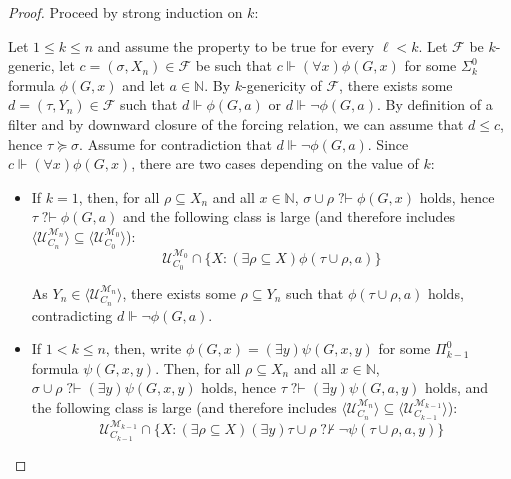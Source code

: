 \documentclass{article}
\def\NN{\mathbb{N}}
\def\F{\mathcal{F}}
\def\U{\mathcal{U}}
\def\M{\mathcal{M}}
\newcommand{\qvdash}{\operatorname{{?}{\vdash}}}
\newcommand{\nqvdash}{\operatorname{{?}{\nvdash}}}
\numberwithin{theorem}{section}
\newtheorem{proposition}[theorem]{Proposition}
\theoremstyle{definition}
\begin{document}

\begin{proof}
Proceed by strong induction on $k$:

Let $1 \leq k \leq n$ and assume the property to be true for every $\ell < k$. Let $\F$ be $k$-generic, let $c = (\sigma, X_n) \in \F$ be such that $c \Vdash (\forall x) \phi(G,x)$ for some $\Sigma_{k}^0$ formula $\phi(G,x)$ and let $a \in \NN$. By $k$-genericity of $\F$, there exists some $d = (\tau,Y_n) \in \F$ such that $d \Vdash \phi(G,a)$ or $d \Vdash \neg \phi(G,a)$. By definition of a filter and by downward closure of the forcing relation, we can assume that $d \leq c$, hence $\tau \succeq \sigma$. Assume for contradiction that $d \Vdash \neg \phi(G,a)$. Since $c \Vdash (\forall x)\phi(G,x)$, there are two cases depending on the value of $k$:
\begin{itemize}
    \item If $k = 1$, then, for all $\rho \subseteq X_n$ and all $x \in \NN$, $\sigma \cup \rho \qvdash \phi(G,x)$ holds, hence $\tau \qvdash \phi(G,a)$ and the following class is large (and therefore includes $\langle \U_{C_n}^{\M_n} \rangle \subseteq \langle \U_{C_{0}}^{\M_{0}} \rangle$):
$$\U_{C_{0}}^{\M_{0}} \cap \{X : (\exists \rho \subseteq X )\phi(\tau \cup \rho, a) \}$$
    
    As $Y_n \in \langle \U_{C_n}^{\M_n} \rangle$, there exists some $\rho \subseteq Y_n$ such that $\phi(\tau \cup \rho, a)$ holds, contradicting $d \Vdash \neg \phi(G,a)$. %
    \item If $1 < k \leq n$, then, write $\phi(G,x) = (\exists y)\psi(G,x,y)$ for some $\Pi_{k-1}^0$ formula $\psi(G,x,y)$. Then, for all $\rho \subseteq X_n$ and all $x \in \NN$, $\sigma \cup \rho \qvdash (\exists y)\psi(G,x,y)$ holds, hence $\tau \qvdash (\exists y) \psi(G,a,y)$ holds, and the following class is large (and therefore includes $\langle \U_{C_n}^{\M_n} \rangle \subseteq \langle \U_{C_{k-1}}^{\M_{k-1}} \rangle$):
$$\U_{C_{k-1}}^{\M_{k-1}} \cap \{X : (\exists \rho \subseteq X )(\exists y) \tau \cup \rho \nqvdash \neg \psi(\tau \cup \rho, a,y) \}$$


\end{itemize}
\end{proof}
\end{document}
